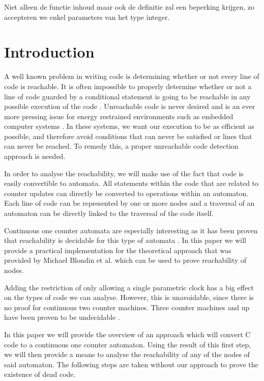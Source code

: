 \documentclass[12pt]{thesis}
\begin{document}
Niet alleen de functie inhoud maar ook de definitie zal een beperking krijgen, zo accepteren we enkel parameters van het type integer.
\newpage
\chapter{Introduction}
A well known problem in writing code is determining whether or not every line of code is reachable. It is often impossible to properly determine whether or not a line of code guarded by a conditional statement is going to be reachable in any possible execution of the code \cite{713323, 10.1145/1292316.1292319}. Unreachable code is never desired and is an ever more pressing issue for energy restrained environments such as embedded computer systems \cite{embeddedefficiency}. In these systems, we want our execution to be as efficient as possible, and therefore avoid conditions that can never be satisfied or lines that can never be reached. To remedy this, a proper unreachable code detection approach is needed.

In order to analyse the reachability, we will make use of the fact that code is easily convertible to automata. All statements within the code that are related to counter updates can directly be converted to operations within an automaton. Each line of code can be represented by one or more nodes and a traversal of an automaton can be directly linked to the traversal of the code itself.

Continuous one counter automata are especially interesting as it has been proven that reachability is decidable for this type of automata \cite{succintandparametriconecounter, danialandjoel, blondin2021continuous}. In this paper we will provide a practical implementation for the theoretical approach that was provided by Michael Blondin et al.\cite{blondin2021continuous} which can be used to prove reachability of nodes. 

Adding the restriction of only allowing a single parametric clock has a big effect on the types of code we can analyse. However, this is unavoidable, since there is no proof for continuous two counter machines. Three counter machines and up have been proven to be undecidable \cite{FEARNLEY201526}.

In this paper we will provide the overview of an approach which will convert C code to a continuous one counter automaton. Using the result of this first step, we will then provide a means to analyse the reachability of any of the nodes of said automaton. The following steps are taken without our approach to prove the existence of dead code.
\end{document}

